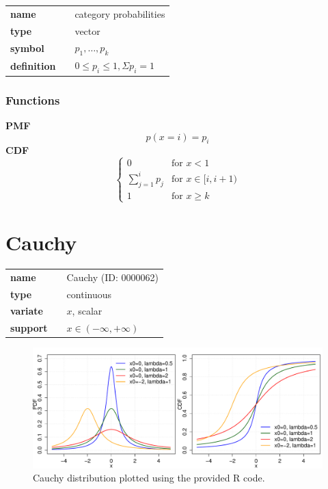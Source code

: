 \documentclass{article}
\begin{document}
\noindent\begin{tabular}{p{2cm}cl}
\textbf{name} & & category probabilities \\
\textbf{type} & & vector \\
\textbf{symbol} & & $p_1, \ldots, p_k$  \\
\textbf{definition} & & $0 \leq p_i \leq 1, \Sigma p_i = 1$
\end{tabular}
\subsubsection*{Functions}

\smallskip \noindent \hspace{.2cm} \textbf{PMF} 
\begin{equation*}p(x=i)=p_i\end{equation*}
\smallskip \noindent \hspace{.2cm} \textbf{CDF} 
\begin{equation*}\begin{cases}
    0 & \text{for }x<1 \\
    \sum_{j=1}^i p_j & \text{for }x \in [i,i+1) \\
    1 & \text{for }x \geq k
    \end{cases}\end{equation*}
\smallskip\section*{Cauchy} 

  \bigskip 

\begin{tabular}{p{2cm}cl}
\textbf{name} & & Cauchy (ID: 0000062)\\ 
 
\textbf{type} & & continuous \\ 

\textbf{variate} & & $x$, scalar \\ 

\textbf{support} & & $x \in (-\infty,+\infty)$
\end{tabular}

\begin{figure}[ht!]
\centering
  \includegraphics[width=140mm]{pics/Cauchy.pdf}
 \caption{Cauchy distribution plotted using the provided R code.}
 \label{fig:Cauchy}
\end{figure}
\end{document}
